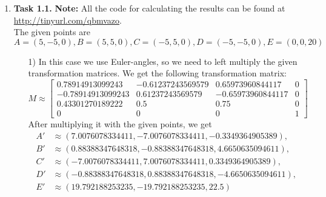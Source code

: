 \documentclass[a4paper,11pt]{article}
\author{\authorinfo}
\title{\titleinfo}
\date{\today}
\begin{document}
\maketitle
\begin {enumerate}
\item[\textbf{Task 1.1.}]
	\textbf{Note:} All the code for calculating the results can be found at \url{http://tinyurl.com/qbmvazo}.\\
	The given points are $A = (5, -5, 0), B = (5, 5, 0), C = (-5, 5, 0), D = (-5, -5, 0), E = (0, 0, 20)$
    \begin{enumerate}
        \item[1)] In this case we use Euler-angles, so we need to left multiply the given transformation matrices. We get the following transformation matrix:
		$$M \approx \begin{bmatrix}
			0.78914913099243 & -0.61237243569579 & 0.65973960844117 & 0\\
-0.78914913099243 & 0.61237243569579 & -0.65973960844117 & 0\\
0.43301270189222 & 0.5 & 0.75 & 0\\
0 & 0 & 0	 & 1
		\end{bmatrix}$$
		After multiplying it with the given points, we get
		\begin{align*}
			A' &\approx (7.0076078334411, -7.0076078334411, -0.3349364905389),\\
			B' &\approx (0.88388347648318, -0.88388347648318, 4.6650635094611),\\
			C' &\approx (-7.0076078334411, 7.0076078334411, 0.3349364905389),\\
			D' &\approx (-0.88388347648318, 0.88388347648318, -4.6650635094611),\\
			E' &\approx (19.792188253235, -19.792188253235, 22.5)
		\end{align*}


\end{enumerate}
\end{enumerate}
\end{document}
